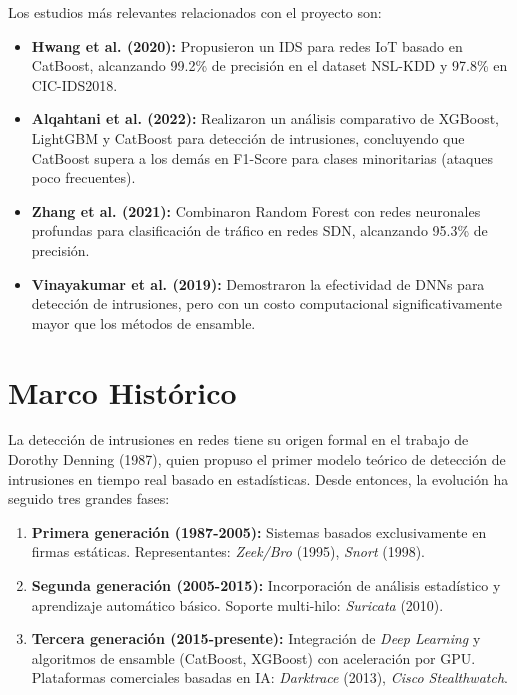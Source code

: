 \documentclass[12pt, letterpaper, oneside]{report}
\begin{document}
Los estudios más relevantes relacionados con el proyecto son:

\begin{itemize}[leftmargin=*]
  \item \textbf{Hwang et al. (2020):} Propusieron un IDS para redes IoT basado en CatBoost, alcanzando 99.2\% de precisión en el dataset NSL-KDD y 97.8\% en CIC-IDS2018.
  \item \textbf{Alqahtani et al. (2022):} Realizaron un análisis comparativo de XGBoost, LightGBM y CatBoost para detección de intrusiones, concluyendo que CatBoost supera a los demás en F1-Score para clases minoritarias (ataques poco frecuentes).
  \item \textbf{Zhang et al. (2021):} Combinaron Random Forest con redes neuronales profundas para clasificación de tráfico en redes SDN, alcanzando 95.3\% de precisión.
  \item \textbf{Vinayakumar et al. (2019):} Demostraron la efectividad de DNNs para detección de intrusiones, pero con un costo computacional significativamente mayor que los métodos de ensamble.
\end{itemize}

\section{Marco Histórico}

La detección de intrusiones en redes tiene su origen formal en el trabajo de Dorothy Denning (1987), quien propuso el primer modelo teórico de detección de intrusiones en tiempo real basado en estadísticas. Desde entonces, la evolución ha seguido tres grandes fases:

\begin{enumerate}[leftmargin=*]
  \item \textbf{Primera generación (1987-2005):} Sistemas basados exclusivamente en firmas estáticas. Representantes: \textit{Zeek/Bro} (1995), \textit{Snort} (1998).
  \item \textbf{Segunda generación (2005-2015):} Incorporación de análisis estadístico y aprendizaje automático básico. Soporte multi-hilo: \textit{Suricata} (2010).
  \item \textbf{Tercera generación (2015-presente):} Integración de \textit{Deep Learning} y algoritmos de ensamble (CatBoost, XGBoost) con aceleración por GPU. Plataformas comerciales basadas en IA: \textit{Darktrace} (2013), \textit{Cisco Stealthwatch}.
\end{enumerate}
\end{document}
